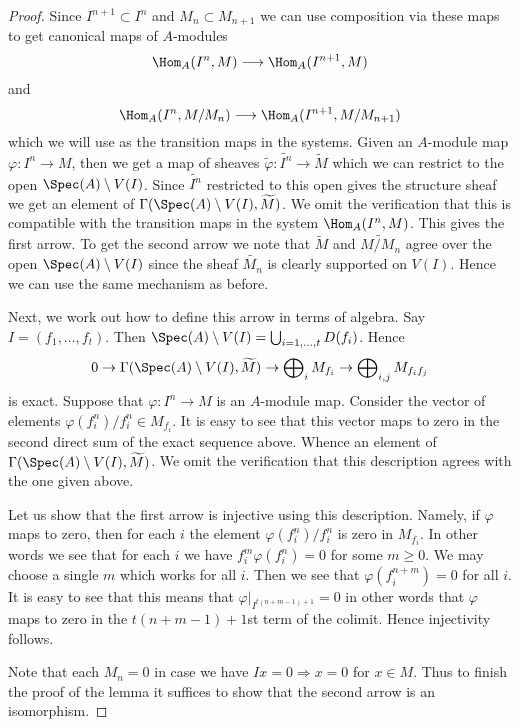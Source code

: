 \begin{proof}
Since $I^{n + 1} \subset I^n$ and $M_n \subset M_{n + 1}$ we can
use composition via these maps to get canonical maps of $A$-modules
$$
\Hom_A(I^n, M)
\longrightarrow
\Hom_A(I^{n + 1}, M)
$$
and
$$
\Hom_A(I^n, M/M_n)
\longrightarrow
\Hom_A(I^{n + 1}, M/M_{n + 1})
$$
which we will use as the transition maps in the systems. Given an
$A$-module map $\varphi : I^n \to M$, then we get a map of
sheaves $\widetilde{\varphi} : \widetilde{I^n} \to \widetilde{M}$
which we can restrict to the open $\Spec(A) \setminus V(I)$.
Since $\widetilde{I^n}$ restricted to this open gives the structure
sheaf we get an element of
$\Gamma(\Spec(A) \setminus V(I), \widetilde{M})$.
We omit the verification that this is compatible with the transition maps
in the system $\Hom_A(I^n, M)$. This gives the first arrow.
To get the second arrow we note that
$\widetilde{M}$ and $\widetilde{M/M_n}$ agree over the open
$\Spec(A) \setminus V(I)$ since the sheaf $\widetilde{M_n}$
is clearly supported on $V(I)$. Hence we can use the same mechanism
as before.

\medskip\noindent
Next, we work out how to define this arrow in terms of algebra.
Say $I = (f_1, \ldots, f_t)$. Then
$\Spec(A) \setminus V(I) = \bigcup_{i = 1, \ldots, t} D(f_i)$.
Hence
$$
0 \to
\Gamma(\Spec(A) \setminus V(I), \widetilde{M}) \to
\bigoplus\nolimits_i M_{f_i} \to
\bigoplus\nolimits_{i, j} M_{f_if_j}
$$
is exact. Suppose that $\varphi : I^n \to M$ is an $A$-module map.
Consider the vector of elements $\varphi(f_i^n)/f_i^n \in M_{f_i}$.
It is easy to see that this vector maps to zero in the
second direct sum of the exact sequence above. Whence an element
of $\Gamma(\Spec(A) \setminus V(I), \widetilde{M})$.
We omit the verification that this description agrees with the one
given above.

\medskip\noindent
Let us show that the first arrow is injective using this description.
Namely, if $\varphi$ maps to zero, then for each $i$ the element
$\varphi(f_i^n)/f_i^n$ is zero in $M_{f_i}$. In other words we
see that for each $i$ we have $f_i^m\varphi(f_i^n) = 0$ for some $m \geq 0$.
We may choose a single $m$ which works for all $i$. Then we see that
$\varphi(f_i^{n + m}) = 0$ for all $i$. It is easy to see that
this means that $\varphi|_{I^{t(n + m - 1) + 1}} = 0$ in other
words that $\varphi$ maps to zero in the $t(n + m - 1) + 1$st
term of the colimit. Hence injectivity follows.

\medskip\noindent
Note that each $M_n = 0$ in case we have
$Ix = 0 \Rightarrow x = 0$ for $x \in M$. Thus
to finish the proof of the lemma it suffices to show that
the second arrow is an isomorphism.


\end{proof}
